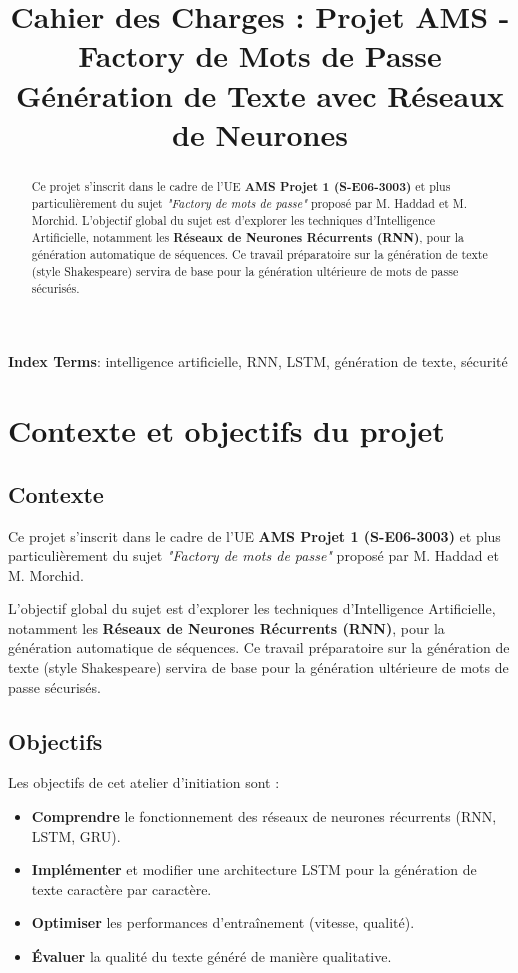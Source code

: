 \documentclass[a4paper]{article}
\title{Cahier des Charges : Projet AMS - Factory de Mots de Passe\\Génération de Texte avec Réseaux de Neurones}
\begin{document}
\maketitle

\begin{abstract}
Ce projet s'inscrit dans le cadre de l'UE \textbf{AMS Projet 1 (S-E06-3003)} et plus particulièrement du sujet \textit{"Factory de mots de passe"} proposé par M. Haddad et M. Morchid.
L'objectif global du sujet est d'explorer les techniques d'Intelligence Artificielle, notamment les \textbf{Réseaux de Neurones Récurrents (RNN)}, pour la génération automatique de séquences. Ce travail préparatoire sur la génération de texte (style Shakespeare) servira de base pour la génération ultérieure de mots de passe sécurisés.
\end{abstract}
\noindent\textbf{Index Terms}: intelligence artificielle, RNN, LSTM, génération de texte, sécurité

\section{Contexte et objectifs du projet}

\subsection{Contexte}
Ce projet s'inscrit dans le cadre de l'UE \textbf{AMS Projet 1 (S-E06-3003)} et plus particulièrement du sujet \textit{"Factory de mots de passe"} proposé par M. Haddad et M. Morchid.

L'objectif global du sujet est d'explorer les techniques d'Intelligence Artificielle, notamment les \textbf{Réseaux de Neurones Récurrents (RNN)}, pour la génération automatique de séquences. Ce travail préparatoire sur la génération de texte (style Shakespeare) servira de base pour la génération ultérieure de mots de passe sécurisés.

\subsection{Objectifs}
Les objectifs de cet atelier d'initiation sont :
\begin{itemize}
    \item \textbf{Comprendre} le fonctionnement des réseaux de neurones récurrents (RNN, LSTM, GRU).
    \item \textbf{Implémenter} et modifier une architecture LSTM pour la génération de texte caractère par caractère.
    \item \textbf{Optimiser} les performances d'entraînement (vitesse, qualité).
    \item \textbf{Évaluer} la qualité du texte généré de manière qualitative.
\end{itemize}
\end{document}
